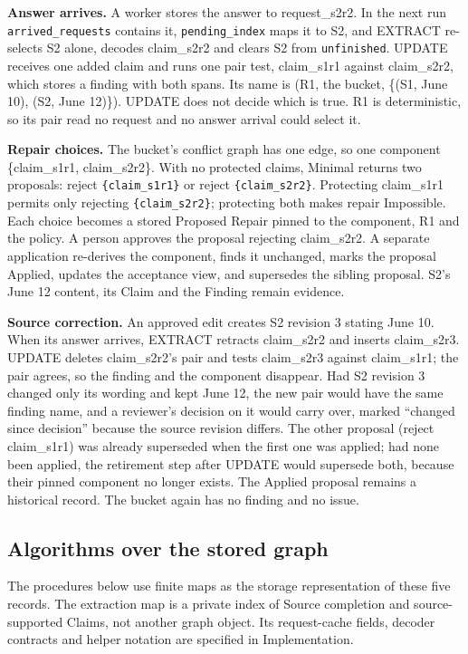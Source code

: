 \documentclass[11pt]{article}
\newcommand{\code}[1]{\texttt{#1}}
\begin{document}
\textbf{Answer arrives.} A worker stores the answer to request\_s2r2. In the
next run \code{arrived\_requests} contains it, \code{pending\_index} maps it to
S2, and EXTRACT re-selects S2 alone, decodes claim\_s2r2 and clears S2 from
\code{unfinished}. UPDATE receives one added claim and runs one pair test,
claim\_s1r1 against claim\_s2r2, which stores a finding with both spans. Its
name is (R1, the bucket, \{(S1, June 10), (S2, June 12)\}). UPDATE does not
decide which is true. R1 is deterministic, so its pair read no request and no
answer arrival could select it.

\textbf{Repair choices.} The bucket's conflict graph has one edge, so one
component \{claim\_s1r1, claim\_s2r2\}. With no protected claims, Minimal
returns two proposals: reject \code{\{claim\_s1r1\}} or reject
\code{\{claim\_s2r2\}}. Protecting claim\_s1r1 permits only rejecting
\code{\{claim\_s2r2\}}; protecting both makes repair Impossible. Each choice
becomes a stored Proposed Repair pinned to the component, R1 and the policy. A
person approves the proposal rejecting claim\_s2r2. A separate application
re-derives the component, finds it unchanged, marks the proposal Applied,
updates the acceptance view, and supersedes the sibling proposal. S2's June 12 content, its Claim and the Finding
remain evidence.

\textbf{Source correction.} An approved edit creates S2 revision 3 stating June
10. When its answer arrives, EXTRACT retracts claim\_s2r2 and inserts
claim\_s2r3. UPDATE deletes claim\_s2r2's pair and tests claim\_s2r3 against
claim\_s1r1; the pair agrees, so the finding and the component disappear. Had
S2 revision 3 changed only its wording and kept June 12, the new pair would
have the same finding name, and a reviewer's decision on it would carry over,
marked ``changed since decision'' because the source revision differs. The other proposal (reject
claim\_s1r1) was already superseded when the first one was applied; had none
been applied, the retirement step after UPDATE would supersede both, because
their pinned component no longer exists. The Applied proposal remains a
historical record. The bucket again has no finding and no issue.

\subsection{Algorithms over the stored graph}

The procedures below use finite maps as the storage representation of these
five records. The extraction map is a private index of Source completion and
source-supported Claims, not another graph object. Its request-cache fields,
decoder contracts and helper notation are specified in Implementation.
\end{document}

